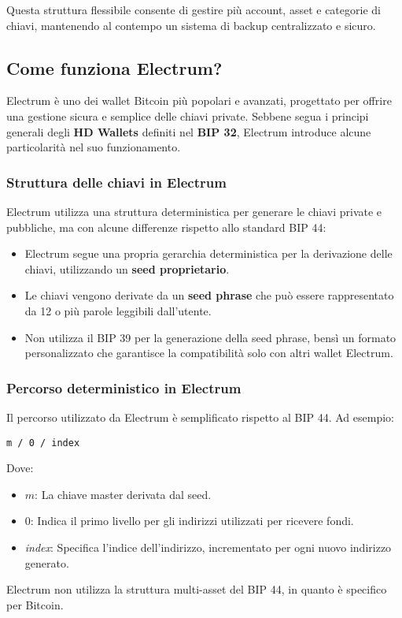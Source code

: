 \documentclass{article}
\begin{document}
Questa struttura flessibile consente di gestire più account, asset e categorie di chiavi, mantenendo al contempo un sistema di backup centralizzato e sicuro.

\subsection{Come funziona Electrum?}
Electrum è uno dei wallet Bitcoin più popolari e avanzati, progettato per offrire una gestione sicura e semplice delle chiavi private. Sebbene segua i principi generali degli \textbf{HD Wallets} definiti nel \textbf{BIP 32}, Electrum introduce alcune particolarità nel suo funzionamento.

\subsubsection{Struttura delle chiavi in Electrum}
Electrum utilizza una struttura deterministica per generare le chiavi private e pubbliche, ma con alcune differenze rispetto allo standard BIP 44:
\begin{itemize}
    \item Electrum segue una propria gerarchia deterministica per la derivazione delle chiavi, utilizzando un \textbf{seed proprietario}.
    \item Le chiavi vengono derivate da un \textbf{seed phrase} che può essere rappresentato da 12 o più parole leggibili dall'utente.
    \item Non utilizza il BIP 39 per la generazione della seed phrase, bensì un formato personalizzato che garantisce la compatibilità solo con altri wallet Electrum.
\end{itemize}

\subsubsection{Percorso deterministico in Electrum}
Il percorso utilizzato da Electrum è semplificato rispetto al BIP 44. Ad esempio:
\begin{verbatim}
m / 0 / index
\end{verbatim}
Dove:
\begin{itemize}
    \item \(m\): La chiave master derivata dal seed.
    \item \(0\): Indica il primo livello per gli indirizzi utilizzati per ricevere fondi.
    \item \textit{index}: Specifica l'indice dell'indirizzo, incrementato per ogni nuovo indirizzo generato.
\end{itemize}
Electrum non utilizza la struttura multi-asset del BIP 44, in quanto è specifico per Bitcoin.
\end{document}
